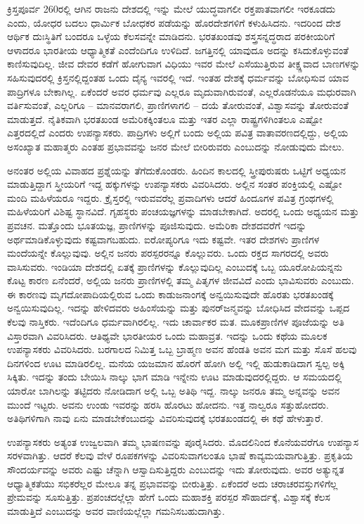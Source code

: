 ಕ್ರಿಸ್ತಪೂರ್ವ 260ರಲ್ಲಿ ಆಗಿನ ರಾಜನು ದೇಶದಲ್ಲಿ ಇನ್ನು ಮೇಲೆ ಯುದ್ಧವಾಗಲೀ ರಕ್ತಪಾತವಾಗಲೀ ಇರಕೂಡದು ಎಂದು, ಯೋಧರ ಬದಲು ಧಾರ್ಮಿಕ ಬೋಧಕರ ಪಡೆಯನ್ನು ಹೊರದೇಶಗಳಿಗೆ ಕಳುಹಿಸಿದನು. ಇದರಿಂದ ದೇಶ ಆರ್ಥಿಕ ದುಃಸ್ಥಿತಿಗೆ ಬಂದರೂ ಒಳ್ಳೆಯ ಕೆಲಸವನ್ನೇ ಮಾಡಿದನು. ಭರತಖಂಡವು ಶಸ್ತ್ರಸನ್ನದ್ಧರಾದ ಪರಕೀಯರಿಗೆ ಆಳಾದರೂ ಭಾರತೀಯ ಆಧ್ಯಾತ್ಮಿಕತೆ ಎಂದೆಂದಿಗೂ ಉಳಿದಿದೆ. ಜಗತ್ತಿನಲ್ಲಿ ಯಾವುದೂ ಅದನ್ನು ಕಸಿದುಕೊಳ್ಳುವಂತೆ ಕಾಣಿಸುವುದಿಲ್ಲ. ಜೀವ ದೇವರ ಕಡೆಗೆ ಹೋಗುವಾಗ ವಿಧಿಯು ಇವರ ಮೇಲೆ ಎಸೆಯುತ್ತಿರುವ ತೀಕ್ಷ್ಣವಾದ ಬಾಣಗಳನ್ನು ಸಹಿಸುವುದರಲ್ಲಿ ಕ್ರಿಸ್ತನಲ್ಲಿದ್ದಂತಹ ಒಂದು ದೈನ್ಯ ಇವರಲ್ಲಿ ಇದೆ. ಇಂತಹ ದೇಶಕ್ಕೆ ಧರ್ಮವನ್ನು ಬೋಧಿಸುವ ಯಾವ ಪಾದ್ರಿಗಳೂ ಬೇಕಾಗಿಲ್ಲ. ಏಕೆಂದರೆ ಅವರ ಧರ್ಮವು ಎಲ್ಲರೂ ಮೃದುವಾಗಿರುವಂತೆ, ಎಲ್ಲರೊಡನೆಯೂ ಮಧುರವಾಗಿ ವರ್ತಿಸುವಂತೆ, ಎಲ್ಲರಿಗೂ – ಮಾನವರಾಗಲಿ, ಪ್ರಾಣಿಗಳಾಗಲಿ – ದಯೆ ತೋರುವಂತೆ, ವಿಶ್ವಾಸವನ್ನು ತೋರುವಂತೆ ಮಾಡುತ್ತದೆ. ನೈತಿಕವಾಗಿ ಭರತಖಂಡ ಅಮೆರಿಕಕ್ಕಿಂತಲೂ ಮತ್ತು ಇತರ ಎಲ್ಲಾ ರಾಷ್ಟ್ರಗಳಿಗಿಂತಲೂ ಎಷ್ಟೋ ಎತ್ತರದಲ್ಲಿದೆ ಎಂದರು ಉಪನ್ಯಾಸಕರು. ಪಾದ್ರಿಗಳು ಅಲ್ಲಿಗೆ ಬಂದು ಅಲ್ಲಿಯ ಪವಿತ್ರ ವಾತಾವರಣದಲ್ಲಿದ್ದು, ಅಲ್ಲಿಯ ಅಸಂಖ್ಯಾತ ಮಹಾತ್ಮರು ಎಂತಹ ಪ್ರಭಾವವನ್ನು ಜನರ ಮೇಲೆ ಬೀರಿರುವರು ಎಂಬುದನ್ನು ನೋಡುವುದು ಮೇಲು.

ಅನಂತರ ಅಲ್ಲಿಯ ವಿವಾಹದ ಪ್ರಶ್ನೆಯನ್ನು ತೆಗೆದುಕೊಂಡರು. ಹಿಂದಿನ ಕಾಲದಲ್ಲಿ ಸ್ತ್ರೀಪುರುಷರು ಒಟ್ಟಿಗೆ ಅಧ್ಯಯನ ಮಾಡುತ್ತಿದ್ದಾಗ ಸ್ತ್ರೀಯರಿಗೆ ಇದ್ದ ಹಕ್ಕುಗಳನ್ನು ಉಪನ್ಯಾಸಕರು ವಿವರಿಸಿದರು. ಅಲ್ಲಿನ ಸಂತರ ಪಂಕ್ತಿಯಲ್ಲಿ ಎಷ್ಟೋ ಮಂದಿ ಮಹಿಳೆಯರೂ ಇದ್ದರು. ಕ್ರೈಸ್ತರಲ್ಲಿ ಇರುವವರೆಲ್ಲ ಪ್ರವಾದಿಗಳು ಆದರೆ ಹಿಂದೂಗಳ ಪವಿತ್ರ ಗ್ರಂಥಗಳಲ್ಲಿ ಮಹಿಳೆಯರಿಗೆ ವಿಶಿಷ್ಟ ಸ್ಥಾನವಿದೆ. ಗೃಹಸ್ಥರು ಪಂಚಯಜ್ಞಗಳನ್ನು ಮಾಡಬೇಕಾಗಿದೆ. ಅದರಲ್ಲಿ ಒಂದು ಅಧ್ಯಯನ ಮತ್ತು ಪ್ರವಚನ. ಮತ್ತೊಂದು ಭೂತಯಜ್ಞ, ಪ್ರಾಣಿಗಳನ್ನು ಪೂಜಿಸುವುದು. ಅಮೆರಿಕಾ ದೇಶದವರೆಗೆ ಇದನ್ನು ಅರ್ಥಮಾಡಿಕೊಳ್ಳುವುದು ಕಷ್ಟವಾಗಬಹುದು. ಐರೋಪ್ಯರಿಗೂ ಇದು ಕಷ್ಟವೇ. ಇತರ ದೇಶಗಳು ಪ್ರಾಣಿಗಳ ಮಂದೆಯನ್ನೇ ಕೊಲ್ಲುವುವು. ಅಲ್ಲಿನ ಜನರು ಪರಸ್ಪರರನ್ನೂ ಕೊಲ್ಲುವರು. ಒಂದು ರಕ್ತದ ಸಾಗರದಲ್ಲಿ ಅವರು ವಾಸಿಸುವರು. ಇಂಡಿಯಾ ದೇಶದಲ್ಲಿ ಏತಕ್ಕೆ ಪ್ರಾಣಿಗಳನ್ನು ಕೊಲ್ಲುವುದಿಲ್ಲ ಎಂಬುದಕ್ಕೆ ಒಬ್ಬ ಯೂರೋಪಿಯನ್ನನು ಕೊಟ್ಟ ಕಾರಣ ಏನೆಂದರೆ, ಅಲ್ಲಿಯ ಜನರು ಪ್ರಾಣಿಗಳಲ್ಲಿ ತಮ್ಮ ಪಿತೃಗಳ ಜೀವವಿದೆ ಎಂದು ಭಾವಿಸುವರು ಎಂಬುದು. ಈ ಕಾರಣವು ಮೃಗದೋಪಾದಿಯಲ್ಲಿರುವ ಒಂದು ಕಾಡುಜನಾಂಗಕ್ಕೆ ಅನ್ವಯಿಸುವುದೇ ಹೊರತು ಭರತಖಂಡಕ್ಕೆ ಅನ್ವಯಿಸುವುದಿಲ್ಲ. ಇದನ್ನು ಹೇಳಿದವರು ಅಹಿಂಸೆಯನ್ನು ಮತ್ತು ಪುನರ್​ಜನ್ಮವನ್ನು ಬೋಧಿಸಿದ ವೇದವನ್ನು ಒಪ್ಪದ ಕೆಲವು ನಾಸ್ತಿಕರು. ಇದೆಂದಿಗೂ ಧರ್ಮವಾಗಿರಲಿಲ್ಲ. ಇದು ಚಾರ್ವಾಕರ ಮತ. ಮೂಕಪ್ರಾಣಿಗಳ ಪೂಜೆಯನ್ನು ಅತಿ ವಿಸ್ತಾರವಾಗಿ ವಿವರಿಸಿದರು. ಆತಿಥ್ಯವೇ ಭಾರತೀಯರ ಒಂದು ಮಹಾವ್ರತ. ಇದನ್ನು ಒಂದು ಕಥೆಯ ಮೂಲಕ ಉಪನ್ಯಾಸಕರು ವಿವರಿಸಿದರು. ಬರಗಾಲದ ನಿಮಿತ್ತ ಒಬ್ಬ ಬ್ರಾಹ್ಮಣ ಅವನ ಹೆಂಡತಿ ಅವನ ಮಗ ಮತ್ತು ಸೊಸೆ ಹಲವು ದಿನಗಳಿಂದ ಊಟ ಮಾಡಿರಲಿಲ್ಲ. ಮನೆಯ ಯಜಮಾನ ಹೊರಗೆ ಹೋಗಿ ಅಲ್ಲಿ ಇಲ್ಲಿ ಹುಡುಕಾಡಿದಾಗ ಸ್ವಲ್ಪ ಅಕ್ಕಿ ಸಿಕ್ಕಿತು. ಇದನ್ನು ತಂದು ಬೇಯಿಸಿ ನಾಲ್ಕು ಭಾಗ ಮಾಡಿ ಇನ್ನೇನು ಊಟ ಮಾಡುವುದರಲ್ಲಿದ್ದರು. ಆ ಸಮಯದಲ್ಲಿ ಯಾರೋ ಬಾಗಿಲನ್ನು ತಟ್ಟಿದರು ನೋಡಿದಾಗ ಅಲ್ಲಿ ಒಬ್ಬ ಅತಿಥಿ ಇದ್ದ. ನಾಲ್ಕು ಜನರೂ ತಮ್ಮ ಅನ್ನವನ್ನು ಅವನ ಮುಂದೆ ಇಟ್ಟರು. ಅವನು ಉಂಡು ಇವರನ್ನು ಹರಸಿ ಹೊರಟು ಹೋದನು. ಇತ್ತ ನಾಲ್ವರೂ ಸತ್ತುಹೋದರು. ಅತಿಥಿಗಳಿಗಾಗಿ ನಾವು ಏನು ಮಾಡಬೇಕೆಂಬುದನ್ನು ವಿವರಿಸುವುದಕ್ಕೆ ಭರತಖಂಡದಲ್ಲಿ ಈ ಕಥೆ ಹೇಳುತ್ತಾರೆ.

ಉಪನ್ಯಾಸಕರು ಅತ್ಯಂತ ಉಜ್ವಲವಾಗಿ ತಮ್ಮ ಭಾಷಣವನ್ನು ಪೂರೈಸಿದರು. ಮೊದಲಿನಿಂದ ಕೊನೆಯವರೆಗೂ ಉಪನ್ಯಾಸ ಸರಳವಾಗಿತ್ತು. ಆದರೆ ಕೆಲವು ವೇಳೆ ರೂಪಕಗಳನ್ನು ವಿವರಿಸುವಾಗಲಂತೂ ಭಾಷೆ ಕಾವ್ಯಮಯವಾಗುತ್ತಿತ್ತು. ಪ್ರಕೃತಿಯ ಸೌಂದರ್ಯವನ್ನು ಅವರು ಎಷ್ಟು ಚೆನ್ನಾಗಿ ಆಸ್ವಾದಿಸುತ್ತಿದ್ದರು ಎಂಬುದನ್ನು ಇದು ತೋರುವುದು. ಅವರ ಅತ್ಯುನ್ನತ ಆಧ್ಯಾತ್ಮಿಕತೆಯು ಸಭಿಕರೆಲ್ಲರ ಮೇಲೂ ತನ್ನ ಪ್ರಭಾವವನ್ನು ಬೀರುತ್ತಿತ್ತು. ಏಕೆಂದರೆ ಅದು ಚರಾಚರವಸ್ತುಗಳಿಗೆಲ್ಲ ಪ್ರೇಮವನ್ನು ಸೂಸುತ್ತಿತ್ತು. ಪ್ರಪಂಚದಲ್ಲೆಲ್ಲಾ ಹೇಗೆ ಒಂದು ಮಹಾಶಕ್ತಿ ಪರಸ್ಪರ ಸೌಹಾರ್ದಕ್ಕೆ, ವಿಶ್ವಾಸಕ್ಕೆ ಕೆಲಸ ಮಾಡುತ್ತಿದೆ ಎಂಬುದನ್ನು ಅವರ ವಾಣಿಯಲ್ಲೆಲ್ಲಾ ಗಮನಿಸಬಹುದಾಗಿತ್ತು.


